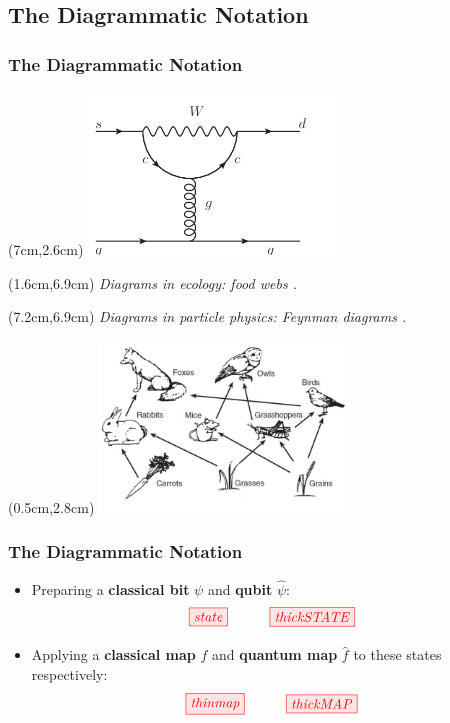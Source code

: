 \documentclass[]{beamer}
\begin{document}
\subsection{The Diagrammatic Notation}

\begin{frame}
	\frametitle{The Diagrammatic Notation}
		\begin{textblock*}{12cm}(7cm,2.6cm)
		\includegraphics[width=0.5\textwidth]{PenguinDiagram.png}
	\end{textblock*}
	\begin{textblock*}{6cm}(1.6cm,6.9cm)
	\tiny	\textit{Diagrams in ecology: food webs \cite{Glaser}.}
	\end{textblock*}
	\begin{textblock*}{6cm}(7.2cm,6.9cm)
		\tiny	\textit{Diagrams in particle physics: Feynman diagrams \cite{Vos}.}
	\end{textblock*}
		\begin{textblock*}{12cm}(0.5cm,2.8cm)
		\includegraphics[width=0.5\textwidth]{FoodWeb.png}
	\end{textblock*}
\end{frame}

\begin{frame}
	\frametitle{The Diagrammatic Notation}
	\begin{itemize}
		\item Preparing a \textbf{classical bit} $\psi$ and \textbf{qubit} $\hat{\psi}$:
		\begin{equation}
		\tikzfig{state} ~~~~~~~~~ \tikzfig{thickSTATE}
		\end{equation}
		\item Applying a \textbf{classical map} $f$ and \textbf{quantum map} $\hat{f}$ to these states respectively:
		\begin{equation}
		\tikzfig{thinmap} ~~~~~~~~~ \tikzfig{thickMAP}
		\end{equation}
	\end{itemize}
\end{frame}
\end{document}
